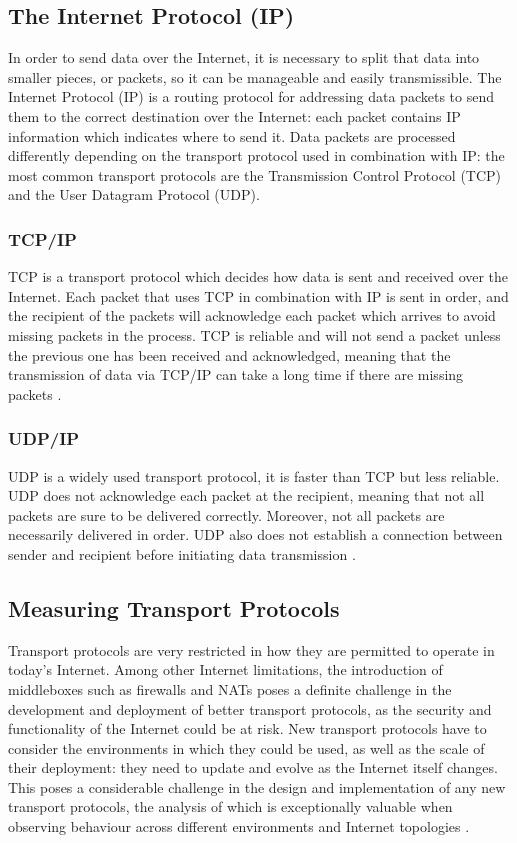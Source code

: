 \documentclass{l4proj}
\begin{document}
\subsection{The Internet Protocol (IP)}

In order to send data over the Internet, it is necessary to split that data into smaller pieces, or packets, so it can be manageable and easily transmissible. The Internet Protocol (IP) is a routing protocol for addressing data packets to send them to the correct destination over the Internet: each packet contains IP information which indicates where to send it. Data packets are processed differently depending on the transport protocol used in combination with IP: the most common transport protocols are the Transmission Control Protocol (TCP) and the User Datagram Protocol (UDP). 

\subsubsection{TCP/IP} TCP is a transport protocol which decides how data is sent and received over the Internet. Each packet that uses TCP in combination with IP is sent in order, and the recipient of the packets will acknowledge each packet which arrives to avoid missing packets in the process. TCP is reliable and will not send a packet unless the previous one has been received and acknowledged, meaning that the transmission of data via TCP/IP can take a long time if there are missing packets \citep{Postel1981}.

\subsubsection{UDP/IP} UDP is a widely used transport protocol, it is faster than TCP but less reliable. UDP does not acknowledge each packet at the recipient, meaning that not all packets are sure to be delivered correctly. Moreover, not all packets are necessarily delivered in order. UDP also does not establish a connection between sender and recipient before initiating data transmission \citep{Postel1980}.

\subsection{Measuring Transport Protocols}

Transport protocols are very restricted in how they are permitted to operate in today's Internet. Among other Internet limitations, the introduction of middleboxes such as firewalls and NATs poses a definite challenge in the development and deployment of better transport protocols, as the security and functionality of the Internet could be at risk. New transport protocols have to consider the environments in which they could be used, as well as the scale of their deployment: they need to update and evolve as the Internet itself changes. This poses a considerable challenge in the design and implementation of any new transport protocols, the analysis of which is exceptionally valuable when observing behaviour across different environments and Internet topologies \citep{Fair2021}.
\end{document}
